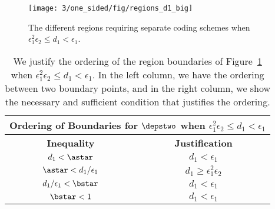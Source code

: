 \begin{figure}
	\centering
	\texttt{[image: 3/one\_sided/fig/regions\_d1\_big]}
	\caption{The different regions requiring separate coding schemes when $\epsilon_1^2\epsilon_2 \leq d_1 < \epsilon_1$.}
	\label{fig:regions_d1_big}
\end{figure}

\begin{table}
	\begin{center}
		\begin{tabular}{| c | c |}
			\hline
			\multicolumn{2}{|c|}{{\bf Ordering of Boundaries for $\depstwo$ when $\epsilon_1^2\epsilon_2 \leq d_1 < \epsilon_1$}} \\
			\hline
			{\bf Inequality} & {\bf Justification}   \\ \hline
			$d_1 < \astar$ & $d_1 < \epsilon_1$ \\ \hline 
			$\astar < d_1/\epsilon_1$ & $d_1 \geq \epsilon_1^2\epsilon_2$ \\ \hline 
			$d_1/\epsilon_1 < \bstar$ &$d_1 < \epsilon_1$ \\ \hline 
			$\bstar < 1$ & $d_1 < \epsilon_1$ \\
			\hline
		\end{tabular}
	\end{center}
	\caption{We justify the ordering of the region boundaries of Figure~\ref{fig:regions_d1_big} when $\epsilon_1^2\epsilon_2 \leq d_1 < \epsilon_1$.  In the left column, we have the ordering between two boundary points, and in the right column, we show the necessary and sufficient condition that justifies the ordering.}	
	\label{tab:d1_big}	
\end{table}
